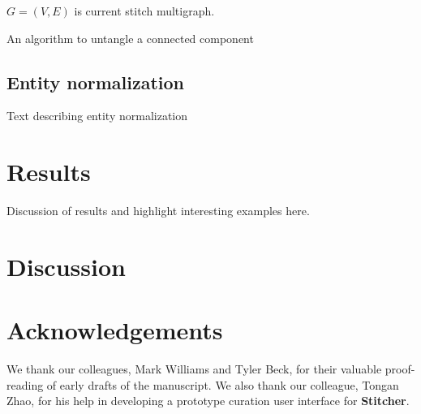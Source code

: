 \documentclass{bioinfo}
\newcommand\st{\textbf{Stitcher}}
\begin{document}
\begin{methods}
\begin{algorithm}\label{algo:untangle}
\SetAlgoLined
\DontPrintSemicolon
$G=(V,E)$ is current stitch multigraph.\\
 \caption{An algorithm to untangle a connected component}
\end{algorithm}


\subsection{Entity normalization}
Text describing entity normalization

\end{methods}

\section{Results}
Discussion of results and highlight interesting examples here.

\section{Discussion}

\section*{Acknowledgements}
We thank our colleagues, Mark Williams and Tyler Beck, for their
valuable proof-reading of early drafts of the manuscript. We also
thank our colleague, Tongan Zhao, for his help in developing a
prototype curation user interface for \st.


%
%
%
%
%
%
%

\end{document}
